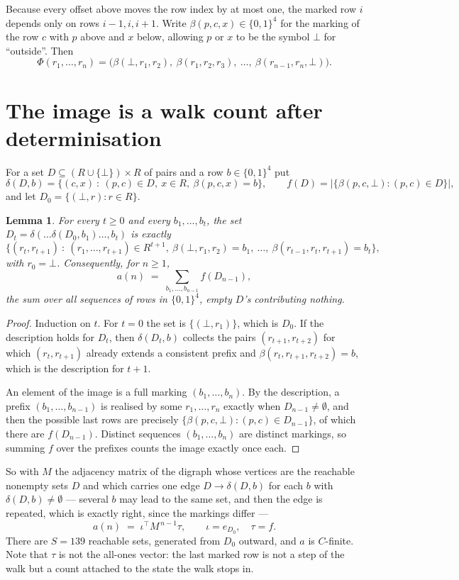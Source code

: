 \documentclass[11pt,a4paper]{article}
\theoremstyle{plain}
\newtheorem{lemma}[theorem]{Lemma}
\theoremstyle{definition}
\begin{document}
Because every offset above moves the row index by at most one, the marked row $i$ depends only
on rows $i-1,i,i+1$. Write $\beta(p,c,x)\in\{0,1\}^{4}$ for the marking of the row $c$
with $p$ above and $x$ below, allowing $p$ or $x$ to be the symbol $\bot$ for ``outside''.
Then
\[
\Phi(r_1,\dots,r_n)=\bigl(\beta(\bot,r_1,r_2),\ \beta(r_1,r_2,r_3),\ \dots,\
\beta(r_{n-1},r_n,\bot)\bigr).
\]

\section{The image is a walk count after determinisation}

For a set $D\subseteq(R\cup\{\bot\})\times R$ of pairs and a row $b\in\{0,1\}^{4}$ put
\[
\delta(D,b)=\{(c,x)\ :\ (p,c)\in D,\ x\in R,\ \beta(p,c,x)=b\},\qquad
f(D)=\bigl|\{\beta(p,c,\bot):(p,c)\in D\}\bigr| ,
\]
and let $D_0=\{(\bot,r):r\in R\}$.

\begin{lemma}\label{lem:det}
For every $t\ge0$ and every $b_1,\dots,b_t$, the set
$D_t=\delta(\dots\delta(D_0,b_1)\dots,b_t)$ is exactly
\[
\{(r_t,r_{t+1})\ :\ (r_1,\dots,r_{t+1})\in R^{t+1},\ \beta(\bot,r_1,r_2)=b_1,\ \dots,\
\beta(r_{t-1},r_t,r_{t+1})=b_t\} ,
\]
with $r_0=\bot$. Consequently, for $n\ge1$,
\[
a(n)\;=\;\sum_{b_1,\dots,b_{n-1}}f(D_{n-1}),
\]
the sum over all sequences of rows in $\{0,1\}^{4}$, empty $D$'s contributing nothing.
\end{lemma}

\begin{proof}
Induction on $t$. For $t=0$ the set is $\{(\bot,r_1)\}$, which is $D_0$. If the description
holds for $D_t$, then $\delta(D_t,b)$ collects the pairs $(r_{t+1},r_{t+2})$ for which
$(r_t,r_{t+1})$ already extends a consistent prefix and
$\beta(r_t,r_{t+1},r_{t+2})=b$, which is the description for $t+1$.

An element of the image is a full marking $(b_1,\dots,b_n)$. By the description, a prefix
$(b_1,\dots,b_{n-1})$ is realised by some $r_1,\dots,r_n$ exactly when $D_{n-1}\neq
\emptyset$, and then the possible last rows are precisely
$\{\beta(p,c,\bot):(p,c)\in D_{n-1}\}$, of which there are $f(D_{n-1})$. Distinct
sequences $(b_1,\dots,b_n)$ are distinct markings, so summing $f$ over the prefixes counts the
image exactly once each.
\end{proof}

So with $M$ the adjacency matrix of the digraph whose vertices are the reachable nonempty sets
$D$ and which carries one edge $D\to\delta(D,b)$ for each $b$ with $\delta(D,b)\neq\emptyset$
--- several $b$ may lead to the same set, and then the edge is repeated, which is exactly
right, since the markings differ ---
\[
a(n)\;=\;\iota^{\!\top}M^{\,n-1}\tau,\qquad \iota=e_{D_0},\quad \tau=f .
\]
There are $S=139$ reachable sets, generated from $D_0$ outward, and $a$ is $C$-finite. Note
that $\tau$ is not the all-ones vector: the last marked row is not a step of the walk but a
count attached to the state the walk stops in.
\end{document}
